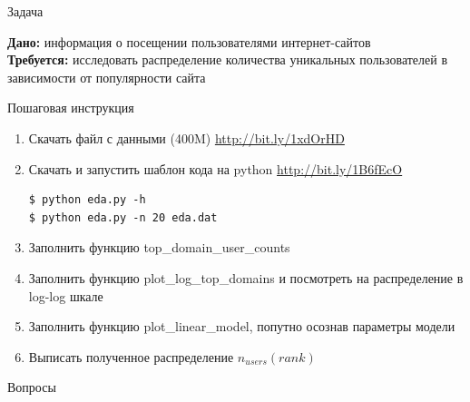 \documentclass[10pt]{beamer}
\begin{document}
\begin{frame}[fragile]{Задача}

{\bf Дано:} информация о посещении пользователями интернет-сайтов \\
{\bf Требуется:} исследовать распределение количества уникальных пользователей в зависимости от популярности сайта

\vspace{1em}
Пошаговая инструкция
\begin{enumerate}
\item Скачать файл с данными (400M) \url{http://bit.ly/1xdOrHD}
\item Скачать и запустить шаблон кода на python \url{http://bit.ly/1B6fEcO}
\begin{shaded}
{\color{green} \begin{verbatim}
$ python eda.py -h
$ python eda.py -n 20 eda.dat
\end{verbatim}}
\end{shaded}
\item Заполнить функцию \textsf{top\_domain\_user\_counts}
\item Заполнить функцию \textsf{plot\_log\_top\_domains} и посмотреть на распределение в log-log шкале
\item Заполнить функцию \textsf{plot\_linear\_model}, попутно осознав параметры модели
\item Выписать полученное распределение $n_{users}(rank)$
\end{enumerate}

\end{frame}

\begin{frame}[plain]
\begin{center}
{\Large Вопросы}
\end{center}
\end{frame}
\end{document}
